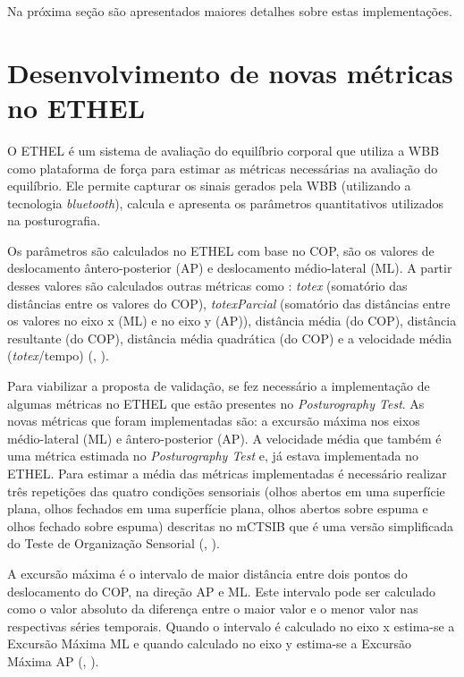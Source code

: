 Na próxima seção são apresentados maiores detalhes sobre estas implementações.

\section{Desenvolvimento de novas métricas no ETHEL}

O ETHEL é um sistema de avaliação do equilíbrio corporal que utiliza a WBB como plataforma de força para estimar as métricas necessárias na avaliação do equilíbrio. Ele permite capturar os sinais gerados pela WBB (utilizando a tecnologia \textit{bluetooth}), calcula e apresenta os parâmetros quantitativos utilizados na posturografia.  

Os parâmetros são calculados no ETHEL com base no COP, são os valores de deslocamento ântero-posterior (AP) e deslocamento médio-lateral (ML). A partir desses valores são calculados outras métricas como : \textit{totex} (somatório das distâncias entre os valores do COP), \textit{totexParcial}  (somatório das distâncias entre os valores no eixo x (ML) e no eixo y (AP)), distância média (do COP), distância resultante (do COP), distância média quadrática (do COP) e a velocidade média (\textit{totex}/tempo) (\citeauthor{Thales2018}, \citeyear{Thales2018}).

Para viabilizar a proposta de validação, se fez necessário a implementação de algumas métricas no ETHEL que estão presentes no \textit{Posturography Test}. 
As novas métricas que foram implementadas são: a excursão máxima nos eixos médio-lateral (ML) e ântero-posterior (AP). A velocidade média que também é uma métrica estimada no \textit{Posturography Test} e, já estava implementada no ETHEL. Para estimar a média das métricas implementadas é necessário realizar três repetições das quatro condições sensoriais (olhos abertos em uma superfície plana, olhos fechados em uma superfície plana, olhos abertos sobre espuma e olhos fechado sobre espuma) descritas no mCTSIB  que é uma versão simplificada do Teste de Organização Sensorial (\citeauthor{ford1995test}, \citeyear{ford1995test}).

A excursão máxima é o intervalo de maior distância entre dois pontos do deslocamento do COP, na direção AP e ML. Este intervalo pode ser calculado como o valor absoluto da diferença entre o maior valor e o menor valor nas respectivas séries temporais. Quando o intervalo é calculado no eixo x estima-se a Excursão Máxima ML e quando calculado no eixo y estima-se  a Excursão Máxima AP (\citeauthor{prieto1996measures}, \citeyear{prieto1996measures}). 


